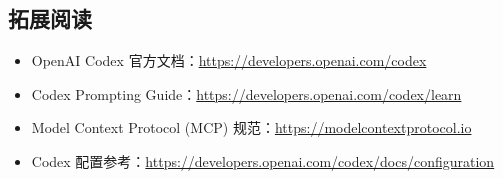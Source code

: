 \documentclass[a4paper]{article}
\begin{document}
\subsection{拓展阅读}

\begin{itemize}
    \item OpenAI Codex 官方文档：\url{https://developers.openai.com/codex}
    \item Codex Prompting Guide：\url{https://developers.openai.com/codex/learn}
    \item Model Context Protocol (MCP) 规范：\url{https://modelcontextprotocol.io}
    \item Codex 配置参考：\url{https://developers.openai.com/codex/docs/configuration}
\end{itemize}

\end{document}
